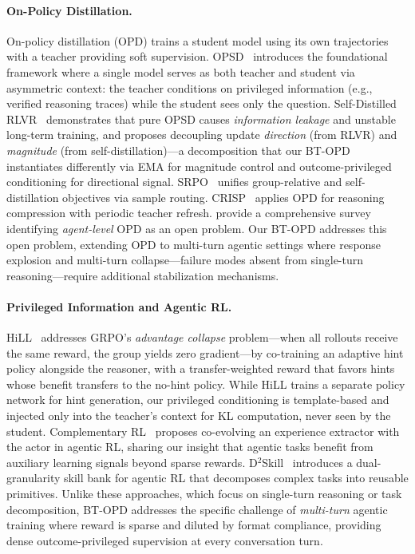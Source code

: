 \documentclass{article}
\begin{document}
\paragraph{On-Policy Distillation.}
On-policy distillation (OPD) trains a student model using its own trajectories with a teacher providing soft supervision. OPSD~\citep{zhao26opsd} introduces the foundational framework where a single model serves as both teacher and student via asymmetric context: the teacher conditions on privileged information (e.g., verified reasoning traces) while the student sees only the question. Self-Distilled RLVR~\citep{yang26rlsd} demonstrates that pure OPSD causes \emph{information leakage} and unstable long-term training, and proposes decoupling update \emph{direction} (from RLVR) and \emph{magnitude} (from self-distillation)---a decomposition that our BT-OPD instantiates differently via EMA for magnitude control and outcome-privileged conditioning for directional signal. SRPO~\citep{li26srpo} unifies group-relative and self-distillation objectives via sample routing. CRISP~\citep{sang26crisp} applies OPD for reasoning compression with periodic teacher refresh. \citet{song26opdsurvey} provide a comprehensive survey identifying \emph{agent-level} OPD as an open problem. Our BT-OPD addresses this open problem, extending OPD to multi-turn agentic settings where response explosion and multi-turn collapse---failure modes absent from single-turn reasoning---require additional stabilization mechanisms.

\paragraph{Privileged Information and Agentic RL.}
HiLL~\citep{xia26hill} addresses GRPO's \emph{advantage collapse} problem---when all rollouts receive the same reward, the group yields zero gradient---by co-training an adaptive hint policy alongside the reasoner, with a transfer-weighted reward that favors hints whose benefit transfers to the no-hint policy. While HiLL trains a separate policy network for hint generation, our privileged conditioning is template-based and injected only into the teacher's context for KL computation, never seen by the student. Complementary RL~\citep{muhtar26complementaryrl} proposes co-evolving an experience extractor with the actor in agentic RL, sharing our insight that agentic tasks benefit from auxiliary learning signals beyond sparse rewards. D$^2$Skill~\citep{tu26d2skill} introduces a dual-granularity skill bank for agentic RL that decomposes complex tasks into reusable primitives. Unlike these approaches, which focus on single-turn reasoning or task decomposition, BT-OPD addresses the specific challenge of \emph{multi-turn} agentic training where reward is sparse and diluted by format compliance, providing dense outcome-privileged supervision at every conversation turn.
\end{document}
